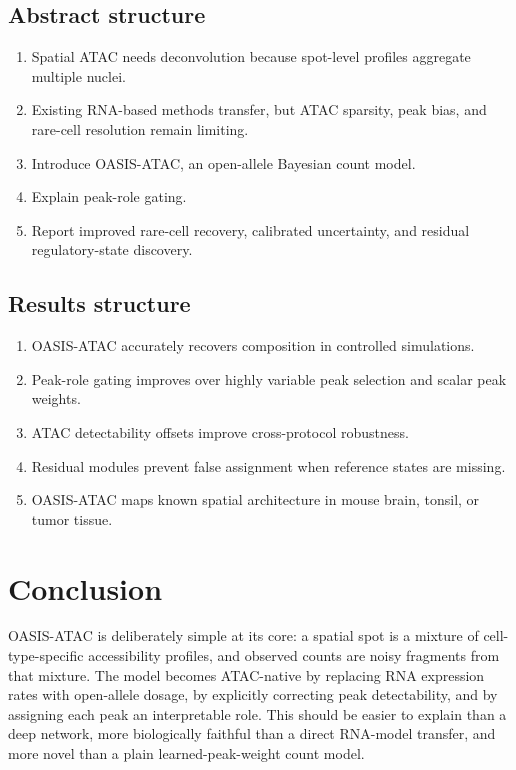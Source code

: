 \documentclass[11pt]{article}
\begin{document}
\subsection{Abstract structure}

\begin{enumerate}
    \item Spatial ATAC needs deconvolution because spot-level profiles aggregate multiple nuclei.
    \item Existing RNA-based methods transfer, but ATAC sparsity, peak bias, and rare-cell resolution remain limiting.
    \item Introduce OASIS-ATAC, an open-allele Bayesian count model.
    \item Explain peak-role gating.
    \item Report improved rare-cell recovery, calibrated uncertainty, and residual regulatory-state discovery.
\end{enumerate}

\subsection{Results structure}

\begin{enumerate}
    \item OASIS-ATAC accurately recovers composition in controlled simulations.
    \item Peak-role gating improves over highly variable peak selection and scalar peak weights.
    \item ATAC detectability offsets improve cross-protocol robustness.
    \item Residual modules prevent false assignment when reference states are missing.
    \item OASIS-ATAC maps known spatial architecture in mouse brain, tonsil, or tumor tissue.
\end{enumerate}

\section{Conclusion}

OASIS-ATAC is deliberately simple at its core: a spatial spot is a mixture of cell-type-specific accessibility profiles, and observed counts are noisy fragments from that mixture. The model becomes ATAC-native by replacing RNA expression rates with open-allele dosage, by explicitly correcting peak detectability, and by assigning each peak an interpretable role. This should be easier to explain than a deep network, more biologically faithful than a direct RNA-model transfer, and more novel than a plain learned-peak-weight count model.
\end{document}
